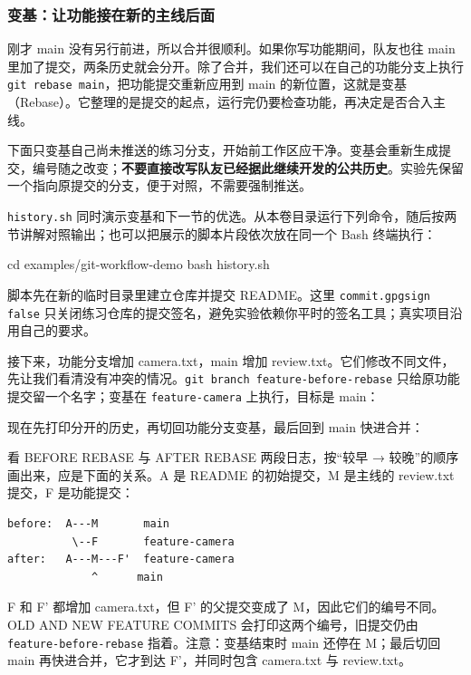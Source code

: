 \subsubsection{变基：让功能接在新的主线后面}
\label{sec:git-rebase}
刚才 main 没有另行前进，所以合并很顺利。如果你写功能期间，队友也往 main 里加了提交，两条历史就会分开。除了合并，我们还可以在自己的功能分支上执行 \texttt{git rebase main}，把功能提交重新应用到 main 的新位置，这就是变基（Rebase）。它整理的是提交的起点，运行完仍要检查功能，再决定是否合入主线。
\begin{note}
下面只变基自己尚未推送的练习分支，开始前工作区应干净。变基会重新生成提交，编号随之改变；\textbf{不要直接改写队友已经据此继续开发的公共历史}。实验先保留一个指向原提交的分支，便于对照，不需要强制推送。
\end{note}
\begin{example}[观察变基前后的提交]
\texttt{history.sh} 同时演示变基和下一节的优选。从本卷目录运行下列命令，随后按两节讲解对照输出；也可以把展示的脚本片段依次放在同一个 Bash 终端执行：
\begin{tbash}
cd examples/git-workflow-demo
bash history.sh
\end{tbash}

脚本先在新的临时目录里建立仓库并提交 README。这里 \texttt{commit.gpgsign false} 只关闭练习仓库的提交签名，避免实验依赖你平时的签名工具；真实项目沿用自己的要求。


接下来，功能分支增加 camera.txt，main 增加 review.txt。它们修改不同文件，先让我们看清没有冲突的情况。\texttt{git branch feature-before-rebase} 只给原功能提交留一个名字；变基在 \texttt{feature-camera} 上执行，目标是 main：


现在先打印分开的历史，再切回功能分支变基，最后回到 main 快进合并：


看 BEFORE REBASE 与 AFTER REBASE 两段日志，按“较早 → 较晚”的顺序画出来，应是下面的关系。A 是 README 的初始提交，M 是主线的 review.txt 提交，F 是功能提交：
\begin{lstlisting}[language={},frame=single]
before:  A---M       main
          \--F       feature-camera
after:   A---M---F'  feature-camera
             ^      main
\end{lstlisting}
F 和 F' 都增加 camera.txt，但 F' 的父提交变成了 M，因此它们的编号不同。OLD AND NEW FEATURE COMMITS 会打印这两个编号，旧提交仍由 \texttt{feature-before-rebase} 指着。注意：变基结束时 main 还停在 M；最后切回 main 再快进合并，它才到达 F'，并同时包含 camera.txt 与 review.txt。
\end{example}
